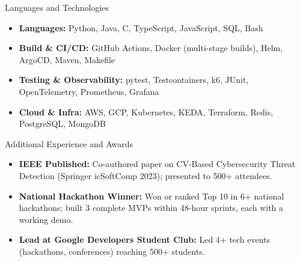\documentclass[]{mcdowellcv}
\begin{document}
\begin{cvsection}{Languages and Technologies}
  \begin{cvsubsection}{}{}{}
    \begin{itemize}
      \item \textbf{Languages:} Python, Java, C, TypeScript, JavaScript, SQL, Bash
      \item \textbf{Build \& CI/CD:} GitHub Actions, Docker (multi-stage builds), Helm, ArgoCD, Maven, Makefile
      \item \textbf{Testing \& Observability:} pytest, Testcontainers, k6, JUnit, OpenTelemetry, Prometheus, Grafana
      \item \textbf{Cloud \& Infra:} AWS, GCP, Kubernetes, KEDA, Terraform, Redis, PostgreSQL, MongoDB
    \end{itemize}
  \end{cvsubsection}
\end{cvsection}

\begin{cvsection}{Additional Experience and Awards}
  \begin{cvsubsection}{}{}{}
    \begin{itemize}
      \item \textbf{IEEE Published:} Co-authored paper on CV-Based Cybersecurity Threat Detection (Springer icSoftComp 2023); presented to 500+ attendees.
      \item \textbf{National Hackathon Winner:} Won or ranked Top 10 in 6+ national hackathons; built 3 complete MVPs within 48-hour sprints, each with a working demo.
      \item \textbf{Lead at Google Developers Student Club:} Led 4+ tech events (hackathons, conferences) reaching 500+ students.
    \end{itemize}
  \end{cvsubsection}
\end{cvsection}
\end{document}
